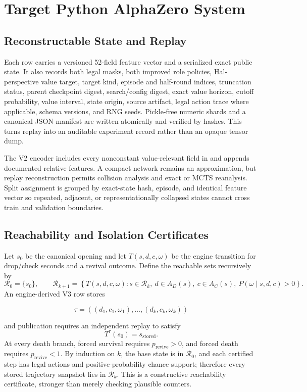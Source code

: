 \documentclass[11pt]{article}
\begin{document}
\section{Target Python AlphaZero System}

\subsection{Reconstructable State and Replay}

Each  row carries a versioned 52-field feature vector
and a serialized exact public state. It also records both legal masks, both
improved role policies, Hal-perspective value target, target kind, episode and
half-round indices, truncation status, parent checkpoint digest, search/config
digest, exact value horizon, cutoff probability, value interval, state origin,
source artifact, legal action trace where applicable, schema versions, and RNG
seeds. Pickle-free numeric shards and a
canonical JSON manifest are written atomically and verified by hashes. This
turns replay into an auditable experiment record rather than an opaque tensor
dump.

The V2 encoder includes every nonconstant value-relevant field in
 and appends documented relative features. A
compact network remains an approximation, but replay reconstruction permits
collision analysis and exact or MCTS reanalysis. Split assignment is grouped
by exact-state hash, episode, and identical feature vector so repeated,
adjacent, or representationally collapsed states cannot cross train and
validation boundaries.

\subsection{Reachability and Isolation Certificates}

Let \(s_0\) be the canonical opening and let
\(T(s,d,c,\omega)\) be the engine transition for drop/check seconds and a
revival outcome. Define the reachable sets recursively by
\[
\mathcal{R}_0=\{s_0\},\qquad
\mathcal{R}_{k+1}=\left\{
T(s,d,c,\omega):s\in\mathcal{R}_k,\ d\in A_D(s),\ c\in A_C(s),
\ P(\omega\mid s,d,c)>0
\right\}.
\]
An engine-derived V3 row stores

\[
\tau=((d_1,c_1,\omega_1),\ldots,(d_k,c_k,\omega_k))
\]

and publication requires an independent replay to satisfy
\[
T^{\tau}(s_0)=s_{\mathrm{stored}}.
\]
At every death branch, forced survival requires \(p_{\mathrm{revive}}>0\), and
forced death requires \(p_{\mathrm{revive}}<1\). By induction on \(k\), the
base state is in \(\mathcal{R}_0\), and each certified step has legal actions
and positive-probability chance support; therefore every stored trajectory
snapshot lies in \(\mathcal{R}_k\). This is a constructive reachability
certificate, stronger than merely checking plausible counters.
\end{document}
